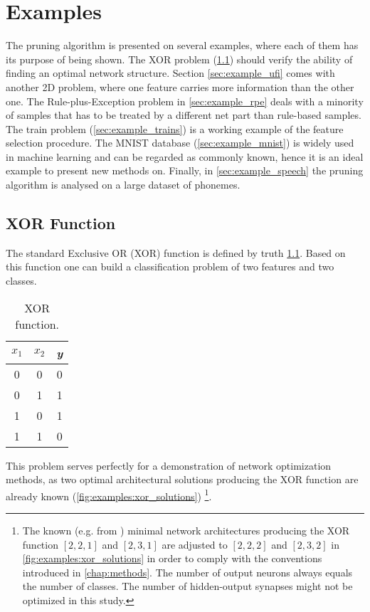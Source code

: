 \chapter{Examples} \label{chap:examples}
The pruning algorithm is presented on several examples, where each of them has its purpose of being shown. The XOR problem (\cref{sec:example_xor}) should verify the ability of finding an optimal network structure. Section \ref{sec:example_ufi} comes with another 2D problem, where one feature carries more information than the other one. The Rule-plus-Exception problem in \cref{sec:example_rpe} deals with a minority of samples that has to be treated by a different net part than rule-based samples. The train problem (\cref{sec:example_trains}) is a working example of the feature selection procedure. The MNIST database (\cref{sec:example_mnist}) is widely used in machine learning and can be regarded as commonly known, hence it is an ideal example to present new methods on. Finally, in \cref{sec:example_speech} the pruning algorithm is analysed on a large dataset of phonemes.

\section{XOR Function} \label{sec:example_xor}
The standard Exclusive OR (XOR) function is defined by truth \cref{tab:examples:xor_function}. Based on this function one can build a classification problem of two features and two classes.

\begin{table}[H]
\centering
\begin{tabular}{|c|c||c|}
\hline
\textit{$ x_1 $} & \textit{$ x_2 $} & \textit{y} \\ \hline \hline
0                & 0                & 0          \\ \hline
0                & 1                & 1          \\ \hline
1                & 0                & 1          \\ \hline
1                & 1                & 0          \\ \hline
\end{tabular}
\caption{XOR function.}
\label{tab:examples:xor_function}
\end{table}

This problem serves perfectly for a demonstration of network optimization methods, as two optimal architectural solutions producing the XOR function are already known (\cref{fig:examples:xor_solutions}) \footnote{The known (e.g. from \citep{online:xor_solution}) minimal network architectures producing the XOR function $ [2, 2, 1] $ and $ [2, 3, 1] $ are adjusted to $ [2, 2, 2] $ and $ [2, 3, 2] $ in \cref{fig:examples:xor_solutions} in order to comply with the conventions introduced in \cref{chap:methods}. The number of output neurons always equals the number of classes. The number of hidden-output synapses might not be optimized in this study.}. 

